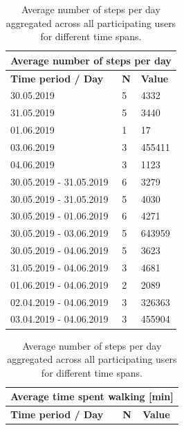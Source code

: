 \begin{table}[]
	\parbox{.45\linewidth}{
		\centering
		\begin{tabular}{|l|l|l|}
			\hline
			\multicolumn{3}{|c|}{\textbf{Average number of steps per day}}          \\ \hline
			\textbf{Time period / Day} & \textbf{N} & \textbf{Value}           \\ \hline
			30.05.2019                 & 5          & 4332                     \\ \hline
			31.05.2019                 & 5          & 3440                     \\ \hline
			01.06.2019                 & 1          & 17                       \\ \hline
			03.06.2019                 & 3          & 455411                   \\ \hline
			04.06.2019                 & 3          & 1123                     \\ \hline
			30.05.2019 - 31.05.2019    & 6          & 3279                     \\ \hline
			30.05.2019 - 31.05.2019    & 5          & 4030                     \\ \hline
			30.05.2019 - 01.06.2019    & 6          & 4271                     \\ \hline
			30.05.2019 - 03.06.2019    & 5          & 643959                   \\ \hline
			30.05.2019 - 04.06.2019    & 5          & 3623                     \\ \hline
			31.05.2019 - 04.06.2019    & 3          & 4681                     \\ \hline
			01.06.2019 - 04.06.2019    & 2          & 2089                     \\ \hline
			02.04.2019 - 04.06.2019    & 3          & 326363                   \\ \hline
			03.04.2019 - 04.06.2019    & 3          & 455904                   \\ \hline
		\end{tabular}
		\caption{Average number of steps per day aggregated across all participating users for different time spans.}
		\label{results-steps}
	}
	\hfill
	\parbox{.45\linewidth}{
		\centering
		\begin{tabular}{|l|l|l|}
			\hline
			\multicolumn{3}{|c|}{\textbf{Average time spent walking {[}min{]}}}          \\ \hline
			\textbf{Time period / Day} & \textbf{N} & \textbf{Value} \\ \hline

\end{tabular}}
\end{table}
